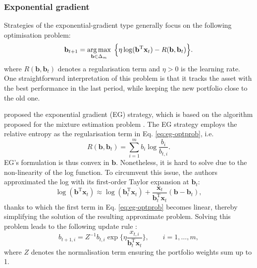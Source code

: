 \subsubsection{Exponential gradient}

Strategies of the exponential-gradient type generally focus on the following optimisation problem:
\begin{equation}
\label{eq:eg-optprob}
	\mathbf{b}_{t+1}
	= \operatorname*{arg\,max}_{\mathbf{b}\in\Delta_m} \; \Big\{\eta \log(\mathbf{b}^\text{T}\mathbf{x}_t) - R(\mathbf{b}, \mathbf{b}_t)\Big\}.
\end{equation}
where $R(\mathbf{b}, \mathbf{b}_t)$ denotes a regularisation term and $\eta > 0$ is the learning rate. One straightforward interpretation of this problem is that it tracks the asset with the best performance in the last period, while keeping the new portfolio close to the old one. 

\citet{eg} proposed the exponential gradient (EG) strategy, which is based on the algorithm proposed for the mixture estimation problem \citep{helmbold97}. The EG strategy employs the relative entropy as the regularisation term in Eq. \eqref{eq:eg-optprob}, i.e.\
\begin{equation}
	R(\mathbf{b}, \mathbf{b}_t)
	= \sum_{i=1}^m b_i \log\frac{b_i}{b_{t,i}}.
\end{equation}
EG's formulation is thus convex in $\mathbf{b}$. Nonetheless, it is hard to solve due to the non-linearity of the log function. To circumvent this issue, the authors approximated the log with its first-order Taylor expansion at $\mathbf{b}_t$:
\begin{equation}
	\log(\mathbf{b}^\text{T}\mathbf{x}_t)
	\approx \log(\mathbf{b}_{t}^\text{T}\mathbf{x}_t) + \frac{\mathbf{x}_t}{\mathbf{b}_{t}^\text{T}\mathbf{x}_t}(\mathbf{b} - \mathbf{b}_{t}),
\end{equation}
thanks to which the first term in Eq. \eqref{eq:eg-optprob} becomes linear, thereby simplifying the solution of the resulting approximate problem. Solving this problem leads to the following update rule \citep[Eq.~(3.3)]{eg}:
\begin{equation}
	b_{t+1,i}
	= Z^{-1}b_{t,i}\exp\Big\{\eta\frac{x_{t,i}}{\mathbf{b}_{t}^\text{T}\mathbf{x}_t}\Big\},
	\qquad i = 1, \ldots, m,
\end{equation}
where $Z$ denotes the normalisation term ensuring the portfolio weights sum up to 1.

